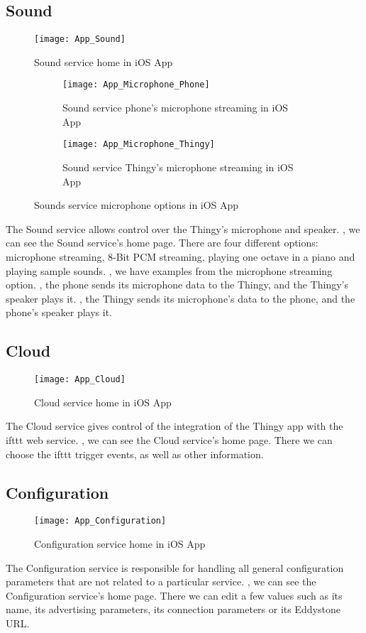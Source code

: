 \subsection{Sound}
\begin{figure}[hbt!]
	\centering
	\texttt{[image: App\_Sound]}
	\caption{Sound service home in iOS App}
	\label{fig:app_sound}
\end{figure}
\begin{figure}[hbt!]
	\centering
	\begin{subfigure}{.5\textwidth}
		\centering
		\texttt{[image: App\_Microphone\_Phone]}
		\caption{Sound service phone's microphone streaming in iOS App}
		\label{fig:app_sound_phone}
	\end{subfigure}
	\begin{subfigure}{.5\textwidth}
		\centering
		\texttt{[image: App\_Microphone\_Thingy]}
		\caption{Sound service Thingy's microphone streaming in iOS App}
		\label{fig:app_sound_thingy}
	\end{subfigure}
	\caption{Sounds service microphone options in iOS App}
	\label{fig:app_sound_microphone}
\end{figure}
The Sound service allows control over the Thingy's microphone and speaker. , we can see the Sound service's home page. There are four different options: microphone streaming, 8-Bit PCM streaming, playing one octave in a piano and playing sample sounds. , we have examples from the microphone streaming option. , the phone sends its microphone data to the Thingy, and the Thingy's speaker plays it. , the Thingy sends its microphone's data to the phone, and the phone's speaker plays it.

\subsection{Cloud}
\begin{figure}[hbt!]
	\centering
	\texttt{[image: App\_Cloud]}
	\caption{Cloud service home in iOS App}
	\label{fig:app_cloud}
\end{figure}
The Cloud service gives control of the integration of the Thingy app with the \gls{ifttt} web service. , we can see the Cloud service's home page. There we can choose the \gls{ifttt} trigger events, as well as other information.

\subsection{Configuration}
\begin{figure}[hbt!]
	\centering
	\texttt{[image: App\_Configuration]}
	\caption{Configuration service home in iOS App}
	\label{fig:app_configuration}
\end{figure}
The Configuration service is responsible for handling all general configuration parameters that are not related to a particular service. , we can see the Configuration service's home page. There we can edit a few values such as its name, its advertising parameters, its connection parameters or its Eddystone URL.


